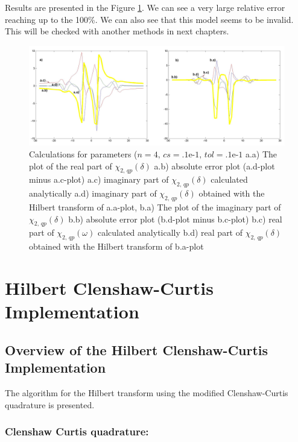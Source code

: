 \documentclass[12pt,twoside,a4paper]{article}
\numberwithin{equation}{subsection}
\numberwithin{figure}{subsection}
\begin{document}
Results are presented in the Figure \ref{fig:nc_quantum2}. We can see a very large relative error reaching up to the 100\%. We can also see
that this model seems to be invalid. This will be checked with another methods in next chapters.

\begin{figure} 
  \includegraphics[width=150mm]{img/nc_quantum2.png}
  \caption{Calculations for parameters ($n=4, \,cs=\mbox{.1e-1}, \,tol=\mbox{.1e-1}$
     a.a) The plot of the real part of ${\chi_{2, \,qp}}(\delta )$
     a.b) absolute error plot (a.d-plot minus a.c-plot) 
     a.c) imaginary part of ${\chi_{2, \,qp}}(\delta )$ calculated analytically 
     a.d) imaginary part of ${\chi_{2, \,qp}}(\delta )$ obtained with the Hilbert transform of a.a-plot, 
     b.a) The plot of the imaginary part of ${\chi_{2, \,qp}}(\delta )$ 
     b.b) absolute error plot (b.d-plot minus b.c-plot) 
     b.c) real part of $\chi_{2, \,qp} (\omega )$ calculated analytically 
     b.d) real part of ${\chi_{2, \,qp}}(\delta )$ obtained with the Hilbert transform of b.a-plot 
     \label{fig:nc_quantum2}
     }
\end{figure}

\section{Hilbert Clenshaw-Curtis Implementation} \label{chap:hcc}

\subsection{Overview of the Hilbert Clenshaw-Curtis Implementation} \label{chap:hcc_overview}

The algorithm for the Hilbert transform using the modified Clenshaw-Curtis quadrature is presented. 

\subsubsection*{Clenshaw Curtis quadrature: }
\end{document}
